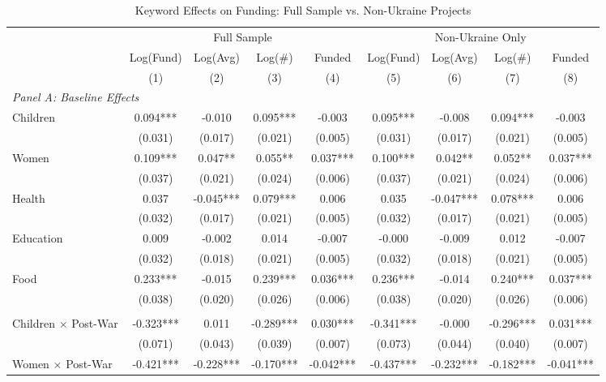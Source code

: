 \begin{table}[htbp]
\centering
\caption{Keyword Effects on Funding: Full Sample vs. Non-Ukraine Projects}
\label{tab:keywords}
\begin{threeparttable}
\small
\begin{tabular}{lcccccccc}
\toprule
& \multicolumn{4}{c}{Full Sample} & \multicolumn{4}{c}{Non-Ukraine Only} \\
\cmidrule(lr){2-5} \cmidrule(lr){6-9}
& Log(Fund) & Log(Avg) & Log(\#) & Funded & Log(Fund) & Log(Avg) & Log(\#) & Funded \\
& (1) & (2) & (3) & (4) & (5) & (6) & (7) & (8) \\
\midrule
\multicolumn{9}{l}{\textit{Panel A: Baseline Effects}} \\
Children & 0.094*** & -0.010 & 0.095*** & -0.003 & 0.095*** & -0.008 & 0.094*** & -0.003 \\
& (0.031) & (0.017) & (0.021) & (0.005) & (0.031) & (0.017) & (0.021) & (0.005) \\
Women & 0.109*** & 0.047** & 0.055** & 0.037*** & 0.100*** & 0.042** & 0.052** & 0.037*** \\
& (0.037) & (0.021) & (0.024) & (0.006) & (0.037) & (0.021) & (0.024) & (0.006) \\
Health & 0.037 & -0.045*** & 0.079*** & 0.006 & 0.035 & -0.047*** & 0.078*** & 0.006 \\
& (0.032) & (0.017) & (0.021) & (0.005) & (0.032) & (0.017) & (0.021) & (0.005) \\
Education & 0.009 & -0.002 & 0.014 & -0.007 & -0.000 & -0.009 & 0.012 & -0.007 \\
& (0.032) & (0.018) & (0.021) & (0.005) & (0.032) & (0.018) & (0.021) & (0.005) \\
Food & 0.233*** & -0.015 & 0.239*** & 0.036*** & 0.236*** & -0.014 & 0.240*** & 0.037*** \\
& (0.038) & (0.020) & (0.026) & (0.006) & (0.038) & (0.020) & (0.026) & (0.006) \\
\addlinespace
\multicolumn{9}{l}{\textit{Panel B: Post-War Interactions}} \\
Children $\times$ Post-War & -0.323*** & 0.011 & -0.289*** & 0.030*** & -0.341*** & -0.000 & -0.296*** & 0.031*** \\
& (0.071) & (0.043) & (0.039) & (0.007) & (0.073) & (0.044) & (0.040) & (0.007) \\
Women $\times$ Post-War & -0.421*** & -0.228*** & -0.170*** & -0.042*** & -0.437*** & -0.232*** & -0.182*** & -0.041*** \\

\end{tabular}
\end{threeparttable}
\end{table}
